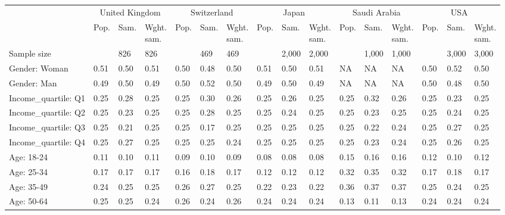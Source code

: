 
\begin{tabular}[t]{llllllllllllllll}
\toprule
\multicolumn{1}{c}{} & \multicolumn{3}{c}{United Kingdom} & \multicolumn{3}{c}{Switzerland} & \multicolumn{3}{c}{Japan} & \multicolumn{3}{c}{Saudi Arabia} & \multicolumn{3}{c}{USA} \\
\cmidrule(l{3pt}r{3pt}){2-4} \cmidrule(l{3pt}r{3pt}){5-7} \cmidrule(l{3pt}r{3pt}){8-10} \cmidrule(l{3pt}r{3pt}){11-13} \cmidrule(l{3pt}r{3pt}){14-16}
  & Pop. & Sam. & \makecell{Wght.\\sam.} & Pop. & Sam. & \makecell{Wght.\\sam.} & Pop. & Sam. & \makecell{Wght.\\sam.} & Pop. & Sam. & \makecell{Wght.\\sam.} & Pop. & Sam. & \makecell{Wght.\\sam.}\\
\midrule
Sample size &  & 826 & 826 &  & 469 & 469 &  & 2,000 & 2,000 &  & 1,000 & 1,000 &  & 3,000 & 3,000\\
\addlinespace
Gender: Woman & 0.51 & 0.50 & 0.51 & 0.50 & 0.48 & 0.50 & 0.51 & 0.50 & 0.51 & NA & NA & NA & 0.50 & 0.52 & 0.50\\
Gender: Man & 0.49 & 0.50 & 0.49 & 0.50 & 0.52 & 0.50 & 0.49 & 0.50 & 0.49 & NA & NA & NA & 0.50 & 0.48 & 0.50\\
\addlinespace
Income\_quartile: Q1 & 0.25 & 0.28 & 0.25 & 0.25 & 0.30 & 0.26 & 0.25 & 0.26 & 0.25 & 0.25 & 0.32 & 0.26 & 0.25 & 0.23 & 0.25\\
Income\_quartile: Q2 & 0.25 & 0.23 & 0.25 & 0.25 & 0.28 & 0.25 & 0.25 & 0.24 & 0.25 & 0.25 & 0.23 & 0.25 & 0.25 & 0.24 & 0.25\\
Income\_quartile: Q3 & 0.25 & 0.21 & 0.25 & 0.25 & 0.17 & 0.25 & 0.25 & 0.25 & 0.25 & 0.25 & 0.22 & 0.24 & 0.25 & 0.27 & 0.25\\
Income\_quartile: Q4 & 0.25 & 0.27 & 0.25 & 0.25 & 0.25 & 0.24 & 0.25 & 0.25 & 0.25 & 0.25 & 0.23 & 0.24 & 0.25 & 0.26 & 0.25\\
\addlinespace
Age: 18-24 & 0.11 & 0.10 & 0.11 & 0.09 & 0.10 & 0.09 & 0.08 & 0.08 & 0.08 & 0.15 & 0.16 & 0.16 & 0.12 & 0.10 & 0.12\\
Age: 25-34 & 0.17 & 0.17 & 0.17 & 0.16 & 0.18 & 0.17 & 0.12 & 0.12 & 0.12 & 0.32 & 0.35 & 0.32 & 0.17 & 0.18 & 0.17\\
Age: 35-49 & 0.24 & 0.25 & 0.25 & 0.26 & 0.27 & 0.25 & 0.22 & 0.23 & 0.22 & 0.36 & 0.37 & 0.37 & 0.25 & 0.24 & 0.25\\
Age: 50-64 & 0.25 & 0.25 & 0.24 & 0.26 & 0.24 & 0.26 & 0.24 & 0.24 & 0.24 & 0.13 & 0.11 & 0.13 & 0.24 & 0.24 & 0.24\\

\end{tabular}
